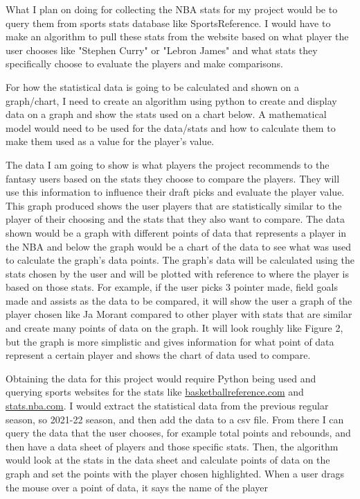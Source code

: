 \documentclass[10pt,twocolumn]{article}
\begin{document}
What I plan on doing for collecting the NBA stats for my project would be to query them from sports stats database like SportsReference. I would have to make an algorithm to pull these stats from the website based on what player the user chooses like "Stephen Curry" or "Lebron James" and what stats they specifically choose to evaluate the players and make comparisons.

For how the statistical data is going to be calculated and shown on a graph/chart, I need to create an algorithm using python to create and display data on a graph and show the stats used on a chart below. A mathematical model would need to be used for the data/stats and how to calculate them to make them used as a value for the player's value.

The data I am going to show is what players the project recommends to the fantasy users based on the stats they choose to compare the players. They will use this information to influence their draft picks and evaluate the player value. This graph produced shows the user players that are statistically similar to the player of their choosing and the stats that they also want to compare. The data shown would be a graph with different points of data that represents a player in the NBA and below the graph would be a chart of the data to see what was used to calculate the graph's data points. The graph's data will be calculated using the stats chosen by the user and will be plotted with reference to where the player is based on those stats. For example, if the user picks 3 pointer made, field goals made and assists as the data to be compared, it will show the user a graph of the player chosen like Ja Morant compared to other player with stats that are similar and create many points of data on the graph. It will look roughly like Figure 2, but the graph is more simplistic and gives information for what point of data represent a certain player and shows the chart of data used to compare. 

Obtaining the data for this project would require Python being used and querying sports websites for the stats like \url{basketballreference.com} and \url{stats.nba.com}. I would extract the statistical data from the previous regular season, so 2021-22 season, and then add the data to a csv file. From there I can query the data that the user chooses, for example total points and rebounds, and then have a data sheet of players and those specific stats. Then, the algorithm would look at the stats in the data sheet and calculate points of data on the graph and set the points with the player chosen highlighted. When a user drags the mouse over a point of data, it says the name of the player
\end{document}
